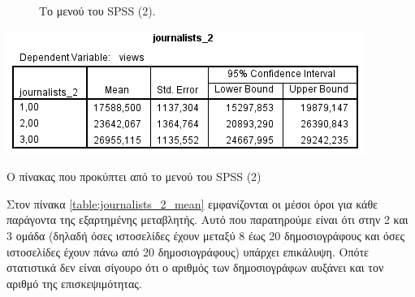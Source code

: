 \documentclass{assignment}
\begin{document}
\begin{Assignment}[Μέρος Δ]
\begin{figure}[htbp]
  \centering
  \caption{Το μενού  του SPSS (2).}
\label{fig:journalists_2_mean}
\end{figure}

\begin{table}[htbp]
\includegraphics[width=\textwidth]{images/table_journalists_2_mean.png}
\caption{Ο πίνακας που προκύπτει από το μενού  του SPSS (2) }
\label{table:journalists_2_mean}
\end{table}


Στον πίνακα \ref{table:journalists_2_mean} εμφανίζονται οι μέσοι όροι για κάθε παράγοντα της εξαρτημένης μεταβλητής. Αυτό που παρατηρούμε είναι ότι στην 2 και 3 ομάδα (δηλαδή όσες ιστοσελίδες έχουν μεταξύ 8 έως 20 δημοσιογράφους και όσες ιστοσελίδες έχουν πάνω από 20 δημοσιογράφους) υπάρχει επικάλυψη. Οπότε στατιστικά δεν είναι σίγουρο ότι ο αριθμός των δημοσιογράφων αυξάνει και τον αριθμό της επισκεψιμότητας.


\end{Assignment}

\clearpage
\end{document}
